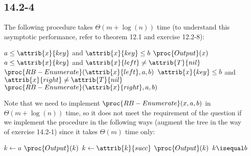 \subsection*{14.2-4}

\noindent
The following procedure takes $\Theta(m+\log(n))$ time 
(to understand this asymptotic performance, refer to theorem 12.1 and exercise 12.2-8):

\begin{codebox}
    \li \If $a \leq \attrib{x}{key}$ and $\attrib{x}{key} \leq b$
    \li \Then
            $\proc{Output}(x)$
        \End
    \li \If $a \leq \attrib{x}{key}$ and $\attrib{x}{left} \neq \attrib{T}{nil}$
    \li \Then
            $\proc{RB-Enumerate}(\attrib{x}{left}, a, b)$
        \End
    \li \If $\attrib{x}{key} \leq b$ and $\attrib{x}{right} \neq \attrib{T}{nil}$
    \li \Then
            $\proc{RB-Enumerate}(\attrib{x}{right}, a, b)$
        \End
\end{codebox}

\noindent
Note that we need to implement $\proc{RB-Enumerate}(x, a, b)$ in $\Theta(m+\log(n))$ time,
so it does not meet the requirement of the question
if we implement the procedure in the following ways (augment the tree in the way of exercise 14.2-1) 
since it takes $\Theta(m)$ time only:

\begin{codebox}
    \li $k \gets a$
    \li $\proc{Output}(k)$
    \li \Repeat
    \li     $k \gets \attrib{k}{succ}$
    \li     $\proc{Output}(k)$
    \li \Until $k \isequal b$
\end{codebox}


